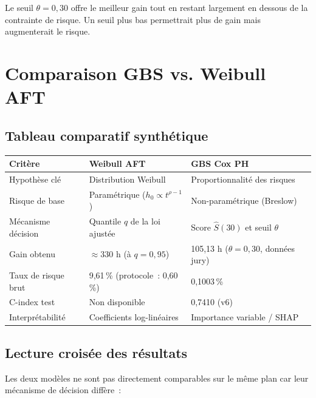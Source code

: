 \documentclass[a4paper,11pt]{article}
\begin{document}
Le seuil $\theta = 0{,}30$ offre le meilleur gain tout en restant largement en dessous de la
contrainte de risque. Un seuil plus bas permettrait plus de gain mais augmenterait le risque.

\section{Comparaison GBS vs. Weibull AFT}

\subsection{Tableau comparatif synthétique}

\begin{center}
\begin{tabular}{p{4cm}p{5cm}p{5cm}}
\toprule
\textbf{Critère} & \textbf{Weibull AFT} & \textbf{GBS Cox PH} \\
\midrule
Hypothèse clé & Distribution Weibull & Proportionnalité des risques \\
Risque de base & Paramétrique ($h_0 \propto t^{\rho-1}$) & Non-paramétrique (Breslow) \\
Mécanisme décision & Quantile $q$ de la loi ajustée & Score $\hat{S}(30)$ et seuil $\theta$ \\
Gain obtenu & $\approx 330$ h (à $q=0{,}95$) & 105,13 h ($\theta = 0{,}30$, données jury) \\
Taux de risque brut & 9,61\,\% (protocole~: 0,60\,\%) & 0,1003\,\% \\
C-index test & Non disponible & 0,7410 (v6) \\
Interprétabilité & Coefficients log-linéaires & Importance variable / SHAP \\
\bottomrule
\end{tabular}
\end{center}

\subsection{Lecture croisée des résultats}

Les deux modèles ne sont pas directement comparables sur le même plan car leur mécanisme de
décision diffère~:
\end{document}
